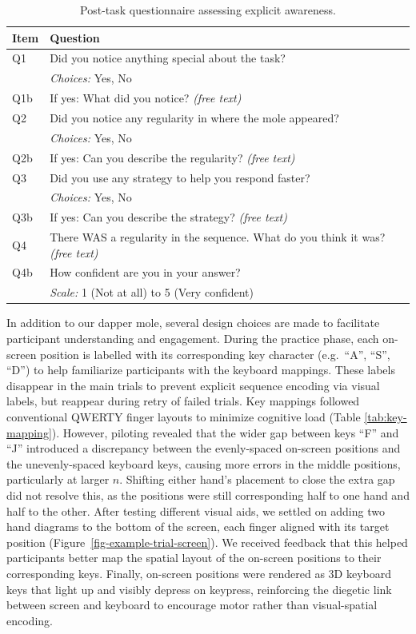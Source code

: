 \documentclass[
  10pt,
  letterpaper]{article}
\begin{document}
\begin{table}[t]
\centering
\caption{Post-task questionnaire assessing explicit awareness.}
\label{tab:questionnaire}
\begin{tabular*}{\columnwidth}{@{} l @{\hspace{0.25cm}} p{8cm} @{}}
\toprule
Item & Question \\
\midrule
Q1 & Did you notice anything special about the task? \\
   & \textit{Choices:} Yes, No \\
Q1b & If yes: What did you notice? \textit{(free text)} \\
\midrule
Q2 & Did you notice any regularity in where the mole appeared? \\
   & \textit{Choices:} Yes, No \\
Q2b & If yes: Can you describe the regularity? \textit{(free text)} \\
\midrule
Q3 & Did you use any strategy to help you respond faster? \\
   & \textit{Choices:} Yes, No \\
Q3b & If yes: Can you describe the strategy? \textit{(free text)} \\
\midrule
Q4 & There WAS a regularity in the sequence. What do you think it was? \textit{(free text)} \\
Q4b & How confident are you in your answer? \\
   & \textit{Scale:} 1 (Not at all) to 5 (Very confident) \\
\bottomrule
\end{tabular*}
\end{table}

In addition to our dapper mole, several design choices are made to
facilitate participant understanding and engagement. During the practice
phase, each on-screen position is labelled with its corresponding key
character (e.g.~``A'', ``S'', ``D'') to help familiarize participants
with the keyboard mappings. These labels disappear in the main trials to
prevent explicit sequence encoding via visual labels, but reappear
during retry of failed trials. Key mappings followed conventional QWERTY
finger layouts to minimize cognitive load (Table \ref{tab:key-mapping}).
However, piloting revealed that the wider gap between keys ``F'' and
``J'' introduced a discrepancy between the evenly-spaced on-screen
positions and the unevenly-spaced keyboard keys, causing more errors in
the middle positions, particularly at larger \(n\). Shifting either
hand's placement to close the extra gap did not resolve this, as the
positions were still corresponding half to one hand and half to the
other. After testing different visual aids, we settled on adding two
hand diagrams to the bottom of the screen, each finger aligned with its
target position (Figure~\ref{fig-example-trial-screen}). We received
feedback that this helped participants better map the spatial layout of
the on-screen positions to their corresponding keys. Finally, on-screen
positions were rendered as 3D keyboard keys that light up and visibly
depress on keypress, reinforcing the diegetic link between screen and
keyboard to encourage motor rather than visual-spatial encoding.
\end{document}
